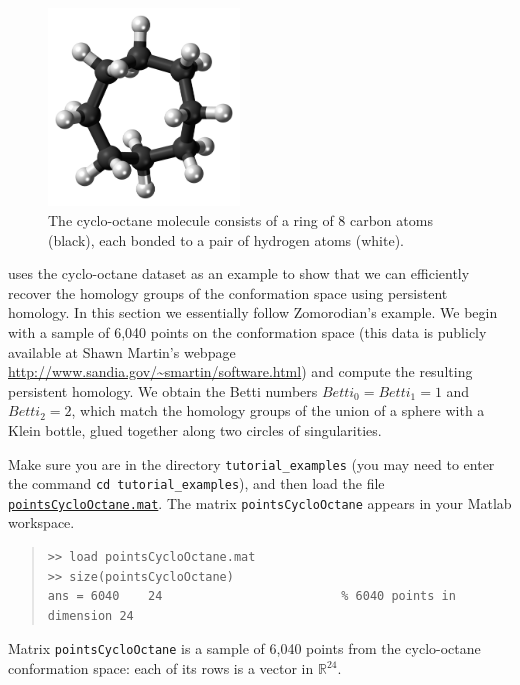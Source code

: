 \documentclass[amscd, amssymb, verbatim]{amsart}[12pt]
\theoremstyle{remark}
\theoremstyle{remark}
\theoremstyle{remark}
\newcommand{\R}{\mathbb{R}}
\begin{document}
\begin{figure}[htp]
	\begin{center}
    	\includegraphics[width=2in]{Cyclooctane-boat-chair-3D-balls.png}
   	\end{center}
	\caption{The cyclo-octane molecule consists of a ring of 8 carbon atoms (black), each bonded to a pair of hydrogen atoms (white).}
  	\label{fig:cyclo}
\end{figure}

\citet{zomorodian2012advances} uses the cyclo-octane dataset as an example to show that we can efficiently recover the homology groups of the conformation space using persistent homology. In this section we essentially follow Zomorodian's example. We begin with a sample of 6,040 points on the conformation space (this data is publicly available at Shawn Martin's webpage \url{http://www.sandia.gov/~smartin/software.html}) and compute the resulting persistent homology. We obtain the Betti numbers $Betti_0 = Betti_1 = 1$ and $Betti_2 = 2$, which match the homology groups of the union of a sphere with a Klein bottle, glued together along two circles of singularities.

Make sure you are in the directory \texttt{tutorial\_examples} (you may need to enter the command \texttt{cd tutorial\_examples}), and then load the file \href{https://github.com/appliedtopology/javaplex/tree/master/src/matlab/for_distribution/tutorial_examples/pointsCycloOctane.mat}{\texttt{pointsCycloOctane.mat}}. The matrix \texttt{pointsCycloOctane} appears in your Matlab workspace.

\begin{quote} \begin{verbatim}
>> load pointsCycloOctane.mat
>> size(pointsCycloOctane)
ans = 6040    24                         % 6040 points in dimension 24
\end{verbatim} \end{quote}

Matrix \texttt{pointsCycloOctane} is a sample of 6,040 points from the cyclo-octane conformation space: each of its rows is a vector in $\R^{24}$.
\end{document}
